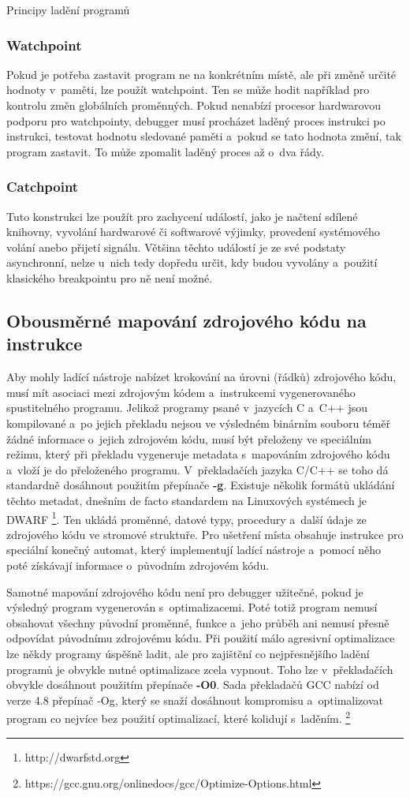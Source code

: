 \documentclass[czech,bachelor,male,python,dept460,hidelinks]{diploma}						%
\newcommand{\parspace}[1][]{
	\ifthenelse{\isempty{#1}}{\vspace{0mm}}{\vspace{#1}}
	\par
}
\begin{document}
\begin{section}{Principy ladění programů}
		\subsubsection{Watchpoint}
			Pokud je potřeba zastavit program ne na konkrétním místě, ale při změně určité hodnoty v~paměti, lze použít watchpoint. Ten se může hodit například pro
			kontrolu změn globálních proměnných. Pokud nenabízí procesor hardwarovou podporu pro watchpointy, debugger musí procházet laděný proces instrukci po
			instrukci, testovat hodnotu sledované paměti a~pokud se tato hodnota změní, tak program zastavit. To může zpomalit laděný proces až
			o~dva řády. \cite{gdb-watchpoints}
		\subsubsection{Catchpoint}
			Tuto konstrukci lze použít pro zachycení událostí, jako je načtení sdílené knihovny, vyvolání hardwarové či softwarové výjimky, provedení
			systémového volání anebo přijetí signálu. Většina těchto událostí je ze své podstaty asynchronní, nelze u~nich tedy dopředu určit, kdy budou vyvolány
			a~použití klasického breakpointu pro ně není možné.	
		
	\subsection{Obousměrné mapování zdrojového kódu na instrukce}
		Aby mohly ladící nástroje nabízet krokování na úrovni (řádků) zdrojového kódu, musí mít asociaci mezi zdrojovým kódem a~instrukcemi vygenerovaného
		spustitelného programu. Jelikož programy psané v~jazycích C a~C++ jsou kompilované a~po jejich překladu nejsou
		ve výsledném binárním souboru téměř žádné informace o~jejich zdrojovém kódu, musí být přeloženy ve speciálním režimu, který při překladu vygeneruje
		metadata s~mapováním zdrojového kódu a~vloží je do přeloženého programu. V~překladačích jazyka C/C++ se toho dá standardně dosáhnout použitím
		přepínače \textbf{-g}. Existuje několik formátů ukládání těchto metadat, dnešním de facto standardem na Linuxových systémech je DWARF
		\footnote{http://dwarfstd.org}. Ten ukládá proměnné, datové typy, procedury a~další údaje ze zdrojového kódu ve stromové struktuře.
		Pro ušetření místa obsahuje instrukce pro speciální konečný automat, který implementují ladící nástroje a~pomocí něho poté získávají
		informace o~původním zdrojovém kódu.
		
		\parspace Samotné mapování zdrojového kódu není pro debugger užitečné, pokud je výsledný program vygenerován s~optimalizacemi. Poté
		totiž program nemusí obsahovat všechny původní proměnné, funkce a~jeho průběh ani nemusí přesně odpovídat původnímu zdrojovému kódu.
		Při použití málo agresivní optimalizace lze někdy programy úspěšně ladit, ale pro zajištění co nejpřesnějšího ladění programů je obvykle nutné
		optimalizace zcela vypnout. Toho lze v~překladačích obvykle dosáhnout použitím přepínače \textbf{-O0}. Sada překladačů GCC nabízí od verze 4.8
		přepínač -Og, který se snaží dosáhnout kompromisu a~optimalizovat program co nejvíce bez použití optimalizací, které kolidují s~laděním.
		\footnote{https://gcc.gnu.org/onlinedocs/gcc/Optimize-Options.html}
	

\end{section}
\end{document}

